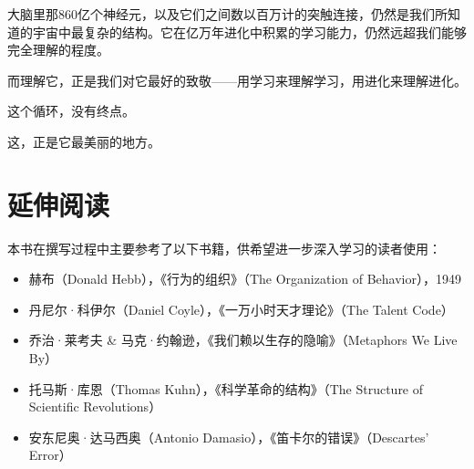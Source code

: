 \documentclass[11pt]{article}
\begin{document}
大脑里那860亿个神经元，以及它们之间数以百万计的突触连接，仍然是我们所知道的宇宙中最复杂的结构。它在亿万年进化中积累的学习能力，仍然远超我们能够完全理解的程度。

而理解它，正是我们对它最好的致敬——用学习来理解学习，用进化来理解进化。

这个循环，没有终点。

这，正是它最美丽的地方。
\section{延伸阅读}
\label{sec:org3daada7}

本书在撰写过程中主要参考了以下书籍，供希望进一步深入学习的读者使用：

\begin{itemize}
\item 赫布（Donald Hebb），《行为的组织》（The Organization of Behavior），1949
\item 丹尼尔·科伊尔（Daniel Coyle），《一万小时天才理论》（The Talent Code）
\item 乔治·莱考夫 \& 马克·约翰逊，《我们赖以生存的隐喻》（Metaphors We Live By）
\item 托马斯·库恩（Thomas Kuhn），《科学革命的结构》（The Structure of Scientific Revolutions）
\item 安东尼奥·达马西奥（Antonio Damasio），《笛卡尔的错误》（Descartes' Error）
\end{itemize}
\end{document}

